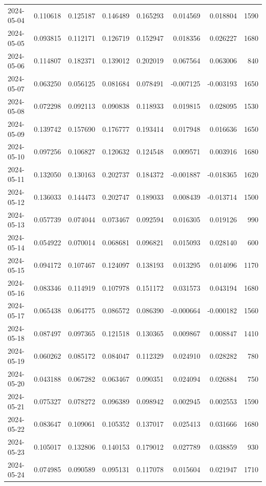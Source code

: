 \begin{tabular}{lrrrrrrr}
2024-05-04 & 0.110618 & 0.125187 & 0.146489 & 0.165293 & 0.014569 & 0.018804 & 1590 \\
2024-05-05 & 0.093815 & 0.112171 & 0.126719 & 0.152947 & 0.018356 & 0.026227 & 1680 \\
2024-05-06 & 0.114807 & 0.182371 & 0.139012 & 0.202019 & 0.067564 & 0.063006 & 840 \\
2024-05-07 & 0.063250 & 0.056125 & 0.081684 & 0.078491 & -0.007125 & -0.003193 & 1650 \\
2024-05-08 & 0.072298 & 0.092113 & 0.090838 & 0.118933 & 0.019815 & 0.028095 & 1530 \\
2024-05-09 & 0.139742 & 0.157690 & 0.176777 & 0.193414 & 0.017948 & 0.016636 & 1650 \\
2024-05-10 & 0.097256 & 0.106827 & 0.120632 & 0.124548 & 0.009571 & 0.003916 & 1680 \\
2024-05-11 & 0.132050 & 0.130163 & 0.202737 & 0.184372 & -0.001887 & -0.018365 & 1620 \\
2024-05-12 & 0.136033 & 0.144473 & 0.202747 & 0.189033 & 0.008439 & -0.013714 & 1500 \\
2024-05-13 & 0.057739 & 0.074044 & 0.073467 & 0.092594 & 0.016305 & 0.019126 & 990 \\
2024-05-14 & 0.054922 & 0.070014 & 0.068681 & 0.096821 & 0.015093 & 0.028140 & 600 \\
2024-05-15 & 0.094172 & 0.107467 & 0.124097 & 0.138193 & 0.013295 & 0.014096 & 1170 \\
2024-05-16 & 0.083346 & 0.114919 & 0.107978 & 0.151172 & 0.031573 & 0.043194 & 1680 \\
2024-05-17 & 0.065438 & 0.064775 & 0.086572 & 0.086390 & -0.000664 & -0.000182 & 1560 \\
2024-05-18 & 0.087497 & 0.097365 & 0.121518 & 0.130365 & 0.009867 & 0.008847 & 1410 \\
2024-05-19 & 0.060262 & 0.085172 & 0.084047 & 0.112329 & 0.024910 & 0.028282 & 780 \\
2024-05-20 & 0.043188 & 0.067282 & 0.063467 & 0.090351 & 0.024094 & 0.026884 & 750 \\
2024-05-21 & 0.075327 & 0.078272 & 0.096389 & 0.098942 & 0.002945 & 0.002553 & 1590 \\
2024-05-22 & 0.083647 & 0.109061 & 0.105352 & 0.137017 & 0.025413 & 0.031666 & 1680 \\
2024-05-23 & 0.105017 & 0.132806 & 0.140153 & 0.179012 & 0.027789 & 0.038859 & 930 \\
2024-05-24 & 0.074985 & 0.090589 & 0.095131 & 0.117078 & 0.015604 & 0.021947 & 1710 \\

\end{tabular}
